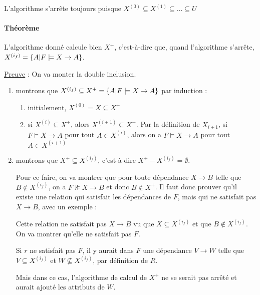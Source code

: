 			L'algorithme s'arrête toujours puisque $X^{(0)} \subseteq X^{(1)} \subseteq \dots \subseteq  U$
			
			\paragraph{Théorème} L'algorithme donné calcule bien $X^+$, c'est-à-dire que, quand l'algorithme s'arrête, $X^{(i_f)} = \lbrace  A \vert F \models X \rightarrow A \rbrace$.
			
			\underline{Preuve} : On va monter la double inclusion.
			
			\begin{enumerate}
				\item montrons que $X^{(i_f)} \subseteq X^+ = \lbrace A \vert F \models X \rightarrow A \rbrace$ par induction :
				
				\begin{enumerate}
					\item initialement, $X^{(0)} = X \subseteq X^+$
					\item si $X^{(i)} \subseteq X^+$, alors $X^{(i + 1)} \subseteq X^+$. Par la définition de $X_{i + 1}$, si $F \models X \rightarrow A$ pour tout $A \in X^{(i)}$, alors on a $F \models X \rightarrow A$ pour tout $A \in X^{(i + 1)}$
				\end{enumerate}
				
				\item montrons que $X^+ \subseteq X^{(i_f)}$, c'est-à-dire $X^+ - X^{(i_f)} = \emptyset$.
				
				Pour ce faire, on va montrer que pour toute dépendance $X \rightarrow B$ telle que $B \notin X^{(i_f)}$, on a $F \nVDash X \rightarrow B$ et donc $B \notin X^+$. Il faut donc prouver qu'il existe une relation qui satisfait les dépendances de $F$, mais qui ne satisfait pas $X \rightarrow B$, avec un exemple :
				
				
				Cette relation ne satisfait pas $X \rightarrow B$ vu que $X \subseteq X^{(i_f)}$ et que $B \notin X^{(i_f)}$. On va montrer qu'elle ne satisfait pas $F$.
				
				Si $r$ ne satisfait pas $F$, il y aurait dans $F$ une dépendance $V \rightarrow W$ telle que $V \subseteq X^{(i_f)}$ et $W \nsubseteq X^{(i_f)}$, par définition de $R$.
				
				Mais dans ce cas, l'algorithme de calcul de $X^+$ ne se serait pas arrêté et aurait ajouté les attributs de $W$.				
			\end{enumerate}
			
